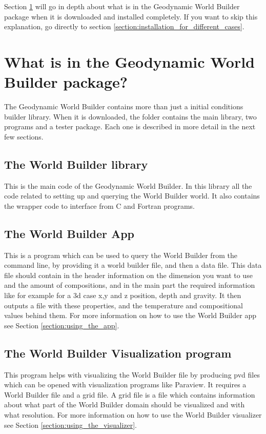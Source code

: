 \documentclass{book}
\newcommand{\GWB}{{Geodynamic World Builder}}
\newcommand{\WB}{{World Builder}}
\newcommand{\paraview}{{Paraview}}
\begin{document}
Section \ref{section:in_package} will go in depth about what is in the \GWB{} package when it is downloaded and installed completely. If you want to skip this explanation, go directly to section \ref{section:installation_for_different_cases}.


\section{What is in the \GWB{} package?}
\label{section:in_package}
The \GWB{} contains more than just a initial conditions builder library. When it is downloaded, the folder contains the main library, two programs and a tester package. Each one is described in more detail in the next few sections.

\subsection{The World Builder library}
This is the main code of the \GWB{}. In this library all the code related to setting up and querying the \WB{} world. It also contains the wrapper code to interface from C and Fortran programs.

\subsection{The World Builder App}
This is a program which can be used to query the \WB{} from the command line, by providing it a world builder file, and then a data file. This data file should contain in the header information on the dimension you want to use and the amount of compositions, and in the main part the required information like for example for a 3d case x,y and z position, depth and gravity. It then outputs a file with these properties, and the temperature and compositional values behind them. For more information on how to use the World Builder app see Section \ref{section:using_the_app}.

\subsection{The World Builder Visualization program}
This program helps with visualizing the \WB{} file by producing pvd files which can be opened with visualization programs like \paraview{}. It requires a \WB{} file and a grid file. A grid file is a file which contains information about what part of the \WB{} domain should be visualized and with what resolution. For more information on how to use the World Builder visualizer see Section \ref{section:using_the_visualizer}.
\end{document}
